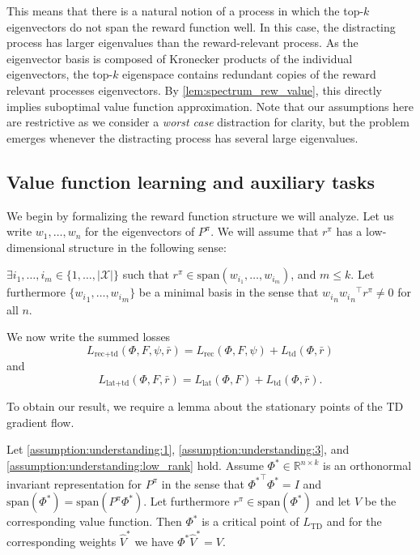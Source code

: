 This means that there is a natural notion of a process in which the top-$k$ eigenvectors do not span the reward function well.
In this case, the distracting process has larger eigenvalues than the reward-relevant process.
As the eigenvector basis is composed of Kronecker products of the individual eigenvectors, the top-$k$ eigenspace contains redundant copies of the reward relevant processes eigenvectors.
By \autoref{lem:spectrum_rew_value}, this directly implies suboptimal value function approximation.
Note that our assumptions here are restrictive as we consider a \emph{worst case} distraction for clarity, but the problem emerges whenever the distracting process has several large eigenvalues.

\subsection{Value function learning and auxiliary tasks}

We begin by formalizing the reward function structure we will analyze. 
Let us write $w_1,\dots,w_n$ for the eigenvectors of $P^\pi$. 
We will assume that $r^\pi$ has a low-dimensional structure in the following sense: 

\begin{assumption}\label{assumption:understanding:low_rank}
    $\exists i_1,\dots,i_m \in \{1,\dots,|\mathcal{X}|\}$ such that $r^\pi \in \mathrm{span}(w_{i_1},\dots,w_{i_m})$, and $m\leq k.$ Let furthermore $\{{w_i}_1,\dots,{w_i}_m\}$ be a minimal basis in the sense that ${w_i}_n {{w_i}_n}^\top r^\pi \neq 0$ for all $n$. 
\end{assumption}
We now write the summed losses $$L_{\text{rec}+\text{td}}(\Phi,F,\psi,\bar{r})= L_\text{rec}(\Phi, F, \psi)+L_\text{td}(\Phi, \bar r)$$ and $$L_{\text{lat}+\text{td}}(\Phi,F,\bar{r})= L_\text{lat}(\Phi, F)+L_\text{td}(\Phi, \bar r).$$ 

To obtain our result, we require a lemma about the stationary points of the TD gradient flow.
\begin{lemma}\label{prop:td_critical}
Let \autoref{assumption:understanding:1}, \autoref{assumption:understanding:3}, and \autoref{assumption:understanding:low_rank} hold.
    Assume $\Phi^* \in \mathbb{R}^{n \times k}$ is an orthonormal invariant representation for $P^\pi$ in the sense that ${\Phi^*}^\top \Phi^* = I$ and $\text{span}(\Phi^*) = \text{span}(P^\pi \Phi^*)$. Let furthermore  $r^\pi \in \text{span}(\Phi^*)$ and let $V$ be the corresponding value function. Then $\Phi^*$ is a critical point of $L_\text{TD}$ and for the corresponding weights $\hat{V}^*$ we have $\Phi^*\hat{V}^* = V$.
\end{lemma}

